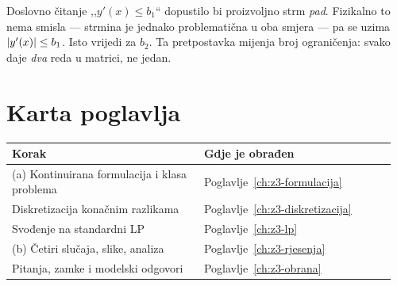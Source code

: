 \begin{zamka}
Doslovno čitanje ,,$y'(x) \leq b_1$`` dopustilo bi proizvoljno strm \emph{pad}.
Fizikalno to nema smisla --- strmina je jednako problematična u oba smjera --- pa
se uzima $\left\lvert y'(x) \right\rvert \leq b_1$. Isto vrijedi za $b_2$. Ta pretpostavka mijenja
broj ograničenja: svako daje \emph{dva} reda u matrici, ne jedan.
\end{zamka}

\section{Karta poglavlja}
\label{sec:z3-karta}

\begin{longtable}{@{}p{0.48\linewidth} p{0.48\linewidth}@{}}
\toprule
\textbf{Korak} & \textbf{Gdje je obrađen} \\
\midrule
\endhead
(a) Kontinuirana formulacija i klasa problema & Poglavlje~\ref{ch:z3-formulacija} \\
Diskretizacija konačnim razlikama & Poglavlje~\ref{ch:z3-diskretizacija} \\
Svođenje na standardni LP & Poglavlje~\ref{ch:z3-lp} \\
(b) Četiri slučaja, slike, analiza & Poglavlje~\ref{ch:z3-rjesenja} \\
Pitanja, zamke i modelski odgovori & Poglavlje~\ref{ch:z3-obrana} \\
\bottomrule
\end{longtable}
